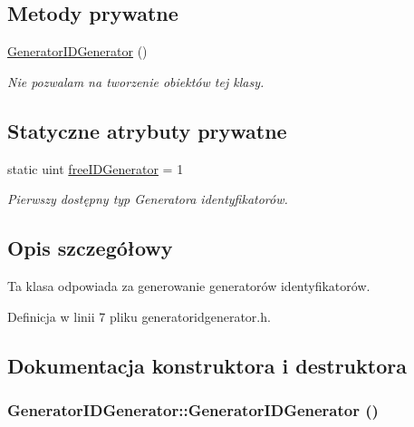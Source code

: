 \subsection*{Metody prywatne}
\begin{DoxyCompactItemize}
\item 
\hyperlink{classGeneratorIDGenerator_a659b541be9156e0ad96561c7f2a4cbd6}{GeneratorIDGenerator} ()
\begin{DoxyCompactList}\small\item\em Nie pozwalam na tworzenie obiektów tej klasy. \item\end{DoxyCompactList}\end{DoxyCompactItemize}
\subsection*{Statyczne atrybuty prywatne}
\begin{DoxyCompactItemize}
\item 
static uint \hyperlink{classGeneratorIDGenerator_a6df8dcb43ce1c7e5f2d4610dfaf1d19e}{freeIDGenerator} = 1
\begin{DoxyCompactList}\small\item\em Pierwszy dostępny typ Generatora identyfikatorów. \item\end{DoxyCompactList}\end{DoxyCompactItemize}


\subsection{Opis szczegółowy}
Ta klasa odpowiada za generowanie generatorów identyfikatorów. 

Definicja w linii 7 pliku generatoridgenerator.h.



\subsection{Dokumentacja konstruktora i destruktora}
\hypertarget{classGeneratorIDGenerator_a659b541be9156e0ad96561c7f2a4cbd6}{
\subsubsection[{GeneratorIDGenerator}]{\setlength{\rightskip}{0pt plus 5cm}GeneratorIDGenerator::GeneratorIDGenerator ()}}
\label{classGeneratorIDGenerator_a659b541be9156e0ad96561c7f2a4cbd6}


